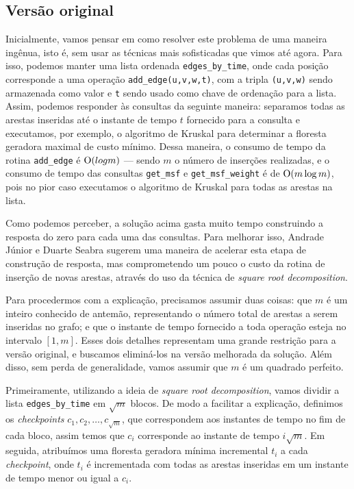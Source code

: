 \subsection{Versão original}
\label{sec:rmsf-versao-ori}

Inicialmente, vamos pensar em como resolver este problema de uma maneira ingênua, isto é, sem usar as técnicas mais sofisticadas que vimos até agora. Para isso, podemos manter uma lista ordenada \texttt{edges\_by\_time}, onde cada posição corresponde a uma operação \texttt{add\_edge(u,v,w,t)}, com a tripla \texttt{(u,v,w)} sendo armazenada como valor e \texttt{t} sendo usado como chave de ordenação para a lista. Assim, podemos responder às consultas da seguinte maneira: separamos todas as arestas inseridas até o instante de tempo $t$ fornecido para a consulta e executamos, por exemplo, o algoritmo de Kruskal para determinar a floresta geradora maximal de custo mínimo. Dessa maneira, o consumo de tempo da rotina \texttt{add\_edge} é $\mathrm{O} (log m)$ --- sendo $m$ o número de inserções realizadas, e o consumo de tempo das consultas \texttt{get\_msf} e \texttt{get\_msf\_weight} é de $\mathrm{O}(m \log m)$, pois no pior caso executamos o algoritmo de Kruskal para todas as arestas na lista.

Como podemos perceber, a solução acima gasta muito tempo construindo a resposta do zero para cada uma das consultas. Para melhorar isso, Andrade Júnior e Duarte Seabra sugerem uma maneira de acelerar esta etapa de construção de resposta, mas comprometendo um pouco o custo da rotina de inserção de novas arestas, através do uso da técnica de \emph{square root decomposition}.

Para procedermos com a explicação, precisamos assumir duas coisas: que $m$ é um inteiro conhecido de antemão, representando o número total de arestas a serem inseridas no grafo; e que o instante de tempo fornecido a toda operação esteja no intervalo $[1,m]$. Esses dois detalhes representam uma grande restrição para a versão original, e buscamos eliminá-los na versão melhorada da solução. Além disso, sem perda de generalidade, vamos assumir que $m$ é um quadrado perfeito.

Primeiramente, utilizando a ideia de \emph{square root decomposition}, vamos dividir a lista \texttt{edges\_by\_time} em $\sqrt m$ blocos. De modo a facilitar a explicação, definimos os \emph{checkpoints} $c_1, c_2, \dots, c_{\sqrt m}$, que correspondem aos instantes de tempo no fim de cada bloco, assim temos que $c_i$ corresponde ao instante de tempo $i \sqrt m$. Em seguida, atribuímos uma floresta geradora mínima incremental $t_i$ a cada \emph{checkpoint}, onde $t_i$ é incrementada com todas as arestas inseridas em um instante de tempo menor ou igual a $c_i$.

